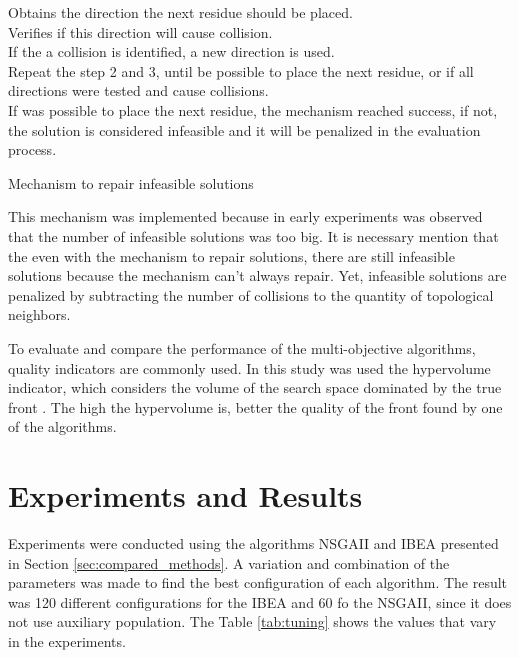 \documentclass[conference]{IEEEtran}
\begin{document}
\begin{algorithm}[h]
	Obtains the direction the next residue should be placed.\\
	Verifies if this direction will cause collision.\\
	If the a collision is identified, a new direction is used.\\
	Repeat the step 2 and 3, until be possible to place the next residue, or if all directions were tested and cause collisions.\\
	If was possible to place the next residue, the mechanism reached success, if not, the solution is considered infeasible and it will be penalized in the evaluation process.
	\caption{Mechanism to repair infeasible solutions}
	\label{algo:reparacao}
\end{algorithm}


This mechanism was implemented because in early experiments was observed that the number of infeasible solutions was too big. It is necessary mention that the even with the mechanism to repair solutions, there are still infeasible solutions because the mechanism can't always repair. Yet, infeasible solutions are penalized by subtracting the number of collisions to the quantity of topological neighbors.


To evaluate and compare the performance of the multi-objective algorithms, quality indicators are commonly used. In this study was used the hypervolume indicator, which considers the volume of the search space dominated by the true front \cite{zitzler2003performance}. The high the hypervolume is, better the quality of the front found by one of the algorithms.


\section{Experiments and Results} \label{sec:experiments}


Experiments were conducted using the algorithms NSGAII and IBEA presented in Section \ref{sec:compared_methods}. A variation and combination of the parameters was made to find the best configuration of each algorithm. The result was 120 different configurations for the IBEA and 60 fo the NSGAII, since it does not use auxiliary population. The Table \ref{tab:tuning} shows the values that vary in the experiments.
\end{document}
